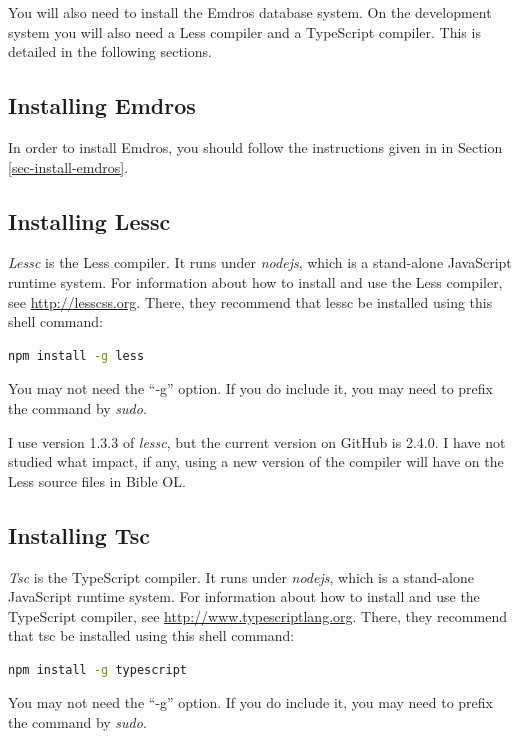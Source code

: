 \documentclass[11pt,oneside,a4paper]{memoir}
\begin{document}
You will also need to install the Emdros database system. On the development system you will also
need a Less compiler and a TypeScript compiler. This is detailed in the following sections.


\subsection{Installing Emdros}

In order to install Emdros, you should follow the instructions given in in Section
\ref{sec-install-emdros}.


\subsection{Installing Lessc}\label{sec-installing-lessc}

\emph{Lessc} is the Less compiler. It runs under \emph{nodejs}, which is a stand-alone JavaScript
runtime system. For information about how to install and use the Less compiler, see
\url{http://lesscss.org}. There, they recommend that lessc be installed using this shell command:

\begin{lstlisting}[language=bash]
npm install -g less
\end{lstlisting}

You may not need the ``-g'' option. If you do include it, you may need to prefix the command by
\emph{sudo}.

I use version 1.3.3 of \emph{lessc}, but the current version on GitHub is 2.4.0. I have not studied
what impact, if any, using a new version of the compiler will have on the Less source files in Bible
OL.

\subsection{Installing Tsc}\label{sec-installing-tsc}

\emph{Tsc} is the TypeScript compiler. It runs under \emph{nodejs}, which is a stand-alone
JavaScript runtime system. For information about how to install and use the TypeScript compiler, see
\url{http://www.typescriptlang.org}. There, they recommend that tsc be installed using this shell
command:

\begin{lstlisting}[language=bash]
npm install -g typescript
\end{lstlisting}

You may not need the ``-g'' option. If you do include it, you may need to prefix the command by
\emph{sudo}.
\end{document}
